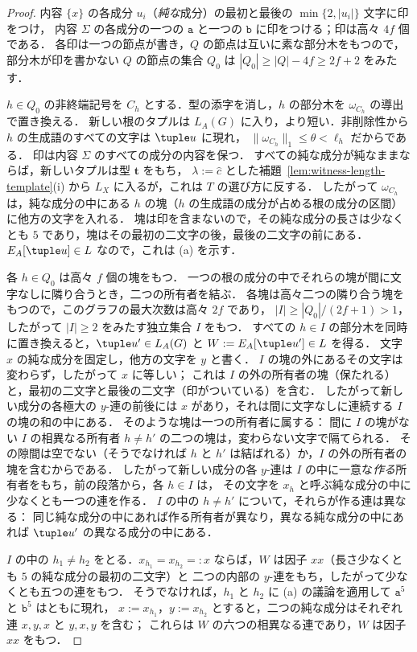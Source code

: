 \begin{proof}
内容 $\{x\}$ の各成分 $u_i$（\emph{純な}成分）の最初と最後の $\min\{2,|u_i|\}$ 文字に印をつけ，
内容 $\Sigma$ の各成分の一つの $\mathtt a$ と一つの $\mathtt b$ に印をつける；印は高々 $4f$ 個である．
各印は一つの節点が書き，$Q$ の節点は互いに素な部分木をもつので，
部分木が印を書かない $Q$ の節点の集合 $Q_0$ は $|Q_0|\ge|Q|-4f\ge2f+2$ をみたす．

$h\in Q_0$ の非終端記号を $C_h$ とする．型の添字を消し，$h$ の部分木を $\omega_{C_h}$ の導出で置き換える．
新しい根のタプルは $L_A(G)$ に入り，より短い．非削除性から $h$ の生成語のすべての文字は $\tuple u$ に現れ，
$\|\omega_{C_h}\|_1\le\theta<\ell_h$ だからである．
印は内容 $\Sigma$ のすべての成分の内容を保つ．
すべての純な成分が純なままならば，新しいタプルは型 $\mathbf t$ をもち，
$\lambda:=\widehat c$ とした補題~\ref{lem:witness-length-template}(i) から $L_X$ に入るが，これは $T$ の選び方に反する．
したがって $\omega_{C_h}$ は，純な成分の中にある $h$ の塊（$h$ の生成語の成分が占める根の成分の区間）に他方の文字を入れる．
塊は印を含まないので，その純な成分の長さは少なくとも $5$ であり，塊はその最初の二文字の後，最後の二文字の前にある．
$E_A[\tuple u]\in L$ なので，これは (a) を示す．

各 $h\in Q_0$ は高々 $f$ 個の塊をもつ．
一つの根の成分の中でそれらの塊が間に文字なしに隣り合うとき，二つの所有者を結ぶ．
各塊は高々二つの隣り合う塊をもつので，このグラフの最大次数は高々 $2f$ であり，
$|I|\ge|Q_0|/(2f+1)>1$，したがって $|I|\ge2$ をみたす独立集合 $I$ をもつ．
すべての $h\in I$ の部分木を同時に置き換えると，$\tuple u'\in L_A(G)$ と $W:=E_A[\tuple u']\in L$ を得る．
文字 $x$ の純な成分を固定し，他方の文字を $y$ と書く．
$I$ の塊の外にあるその文字は変わらず，したがって $x$ に等しい；
これは $I$ の外の所有者の塊（保たれる）と，最初の二文字と最後の二文字（印がついている）を含む．
したがって新しい成分の各極大の $y$-連の前後には $x$ があり，それは間に文字なしに連続する $I$ の塊の和の中にある．
そのような塊は一つの所有者に属する：
間に $I$ の塊がない $I$ の相異なる所有者 $h\ne h'$ の二つの塊は，変わらない文字で隔てられる．
その隙間は空でない（そうでなければ $h$ と $h'$ は結ばれる）か，$I$ の外の所有者の塊を含むからである．
したがって新しい成分の各 $y$-連は $I$ の中に一意な\emph{作る}所有者をもち，前の段落から，各 $h\in I$ は，
その文字を $x_h$ と呼ぶ純な成分の中に少なくとも一つの連を作る．
$I$ の中の $h\ne h'$ について，それらが作る連は異なる：
同じ純な成分の中にあれば作る所有者が異なり，異なる純な成分の中にあれば $\tuple u'$ の異なる成分の中にある．

$I$ の中の $h_1\ne h_2$ をとる．$x_{h_1}=x_{h_2}=:x$ ならば，$W$ は因子 $xx$（長さ少なくとも $5$ の純な成分の最初の二文字）と
二つの内部の $y$-連をもち，したがって少なくとも五つの連をもつ．
そうでなければ，$h_1$ と $h_2$ に (a) の議論を適用して $\mathtt a^5$ と $\mathtt b^5$ はともに現れ，
$x:=x_{h_1}$，$y:=x_{h_2}$ とすると，二つの純な成分はそれぞれ連 $x,y,x$ と $y,x,y$ を含む；
これらは $W$ の六つの相異なる連であり，$W$ は因子 $xx$ をもつ．
\end{proof}

